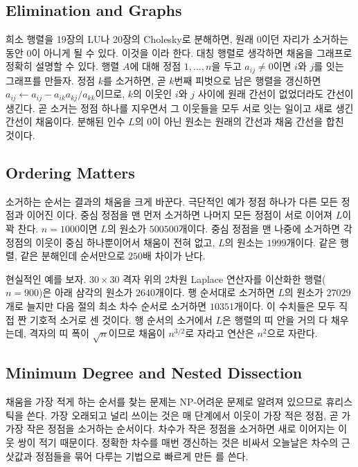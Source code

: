 \subsection{Elimination and Graphs}

희소 행렬을 19장의 LU나 20장의 Cholesky로 분해하면, 원래 $0$이던 자리가 소거하는 동안 $0$이 아니게 될 수 있다. 이것을 이라 한다. 대칭 행렬로 생각하면 채움을 그래프로 정확히 설명할 수 있다\cite{parter1961}. 행렬 $A$에 대해 정점 $1,\dots,n$을 두고 $a_{ij}\ne0$이면 $i$와 $j$를 잇는 그래프를 만들자. 정점 $k$를 소거하면, 곧 $k$번째 피벗으로 남은 행렬을 갱신하면 $a_{ij}\gets a_{ij}-a_{ik}a_{kj}/a_{kk}$이므로, $k$의 이웃인 $i$와 $j$ 사이에 원래 간선이 없었더라도 간선이 생긴다. 곧 소거는 정점 하나를 지우면서 그 이웃들을 모두 서로 잇는 일이고 새로 생긴 간선이 채움이다. 분해된 인수 $L$의 $0$이 아닌 원소는 원래의 간선과 채움 간선을 합친 것이다.

\subsection{Ordering Matters}

소거하는 순서는 결과의 채움을 크게 바꾼다. 극단적인 예가 정점 하나가 다른 모든 정점과 이어진 이다. 중심 정점을 맨 먼저 소거하면 나머지 모든 정점이 서로 이어져 $L$이 꽉 찬다. $n=1000$이면 $L$의 원소가 $500500$개이다. 중심 정점을 맨 나중에 소거하면 각 정점의 이웃이 중심 하나뿐이어서 채움이 전혀 없고, $L$의 원소는 $1999$개이다. 같은 행렬, 같은 분해인데 순서만으로 $250$배 차이가 난다.

현실적인 예를 보자. $30\times30$ 격자 위의 2차원 Laplace 연산자를 이산화한 행렬($n=900$)은 아래 삼각의 원소가 $2640$개이다. 행 순서대로 소거하면 $L$의 원소가 $27029$개로 늘지만 다음 절의 최소 차수 순서로 소거하면 $10351$개이다. 이 수치들은 모두 직접 짠 기호적 소거로 센 것이다. 행 순서의 소거에서 $L$은 행렬의 띠 안을 거의 다 채우는데, 격자의 띠 폭이 $\sqrt n$이므로 채움이 $n^{3/2}$로 자라고 연산은 $n^2$으로 자란다.

\subsection{Minimum Degree and Nested Dissection}

채움을 가장 적게 하는 순서를 찾는 문제는 NP-어려운 문제로 알려져 있으므로 휴리스틱을 쓴다. 가장 오래되고 널리 쓰이는 것은 매 단계에서 이웃이 가장 적은 정점, 곧 가 가장 작은 정점을 소거하는  순서이다\cite{tinney1967}. 차수가 작은 정점을 소거하면 새로 이어지는 이웃 쌍이 적기 때문이다. 정확한 차수를 매번 갱신하는 것은 비싸서 오늘날은 차수의 근삿값과 정점들을 묶어 다루는 기법으로 빠르게 만든 를 쓴다\cite{amestoy1996amd}.

